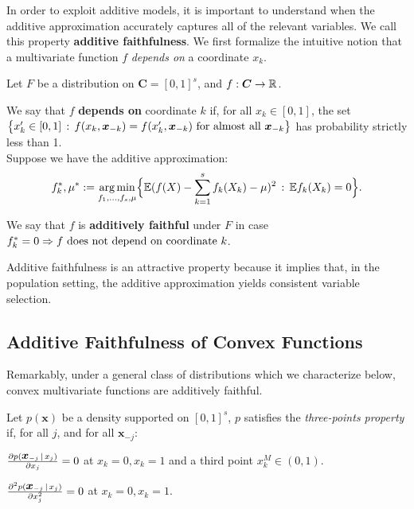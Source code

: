 In order to exploit additive models, it is important to understand when the
additive approximation accurately captures all of the relevant variables.
We call this property \textbf{additive faithfulness}. We first formalize the intuitive notion that a multivariate function $f$ \emph{depends on} a coordinate $x_k$.

\begin{definition}
  Let $F$ be a distribution on $\mathbf{C}=[0,1]^s$, and $f:\mbox{\boldmath $C$}\rightarrow {\mathbb R}$. 
  
We say that $f$ \textbf{depends on} coordinate $k$ if, for all $x_k \in [0,1]$, the set 
$\big\{ x'_k \in [0, 1] \,:\, f(x_k, \mbox{\boldmath $x$}_{-k}) = f(x'_k, \mbox{\boldmath $x$}_{-k}) 
\textrm{ for almost all  $\mbox{\boldmath $x$}_{-k}$} \big\}$ 
has probability strictly less than 1.\\

Suppose we have the additive approximation:
\begin{equation}
f_k^*, \mu^* := \mathop{\text{\rm arg\,min}}_{f_1,\ldots, f_s, \mu} \Bigl\{ 
             {\mathbb E} ( f(X) - \sum_{k=1}^s f_k(X_k) -\mu )^2 
         \,:\, {\mathbb E} f_k(X_k) = 0 \Bigr\}.
\end{equation}

We say that $f$ is \textbf{additively faithful} under $F$ in case $f^*_k = 0 \Rightarrow \textrm{$f$ does not depend on coordinate $k$}$. 

\end{definition}

Additive faithfulness is an attractive property because it implies that, in the population setting, the additive approximation yields consistent variable selection. 

\subsection{Additive Faithfulness of Convex Functions}

Remarkably, under a general class of distributions which we characterize below, convex multivariate functions are additively faithful.

\begin{definition}
\label{defn:three-point}
Let $p(\mathbf{x})$ be a density supported on $[0,1]^s$, $p$ satisfies the \emph{three-points property} if, for all $j$, and for all $\mathbf{x}_{-j}$:
\begin{packed_enum}
\item $\frac{\partial p(\mbox{\boldmath $x$}_{-j} {\,|\,} x_j)}{\partial x_j}  = 0$ at $x_k = 0, x_k = 1$ and a third point $x_k^M \in (0,1)$.
\item $\frac{\partial^2 p(\mbox{\boldmath $x$}_{-j} {\,|\,} x_j)}{\partial x_j^2} = 0$ at $x_k = 0, x_k = 1$.
\end{packed_enum}
\end{definition}



